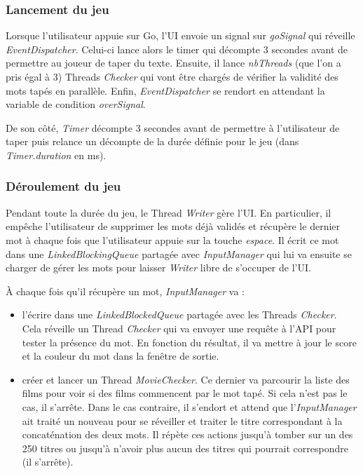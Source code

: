 \documentclass[a4paper,11pt]{article}
\begin{document}
\subsubsection{Lancement du jeu}
Lorsque l'utilisateur appuie sur Go, l'UI envoie un signal sur \textit{goSignal} qui réveille \textit{EventDispatcher}. Celui-ci lance alors le timer qui décompte 3 secondes avant de permettre au joueur de taper du texte. Ensuite, il lance \textit{nbThreads} (que l'on a pris égal à 3) Threads \textit{Checker} qui vont être chargés de vérifier la validité des mots tapés en parallèle. Enfin, \textit{EventDispatcher} se rendort en attendant la variable de condition \textit{overSignal}.\par
De son côté, \textit{Timer} décompte 3 secondes avant de permettre à l'utilisateur de taper puis relance un décompte de la durée définie pour le jeu (dans \textit{Timer.duration} en ms).\par
\subsubsection{Déroulement du jeu} 
Pendant toute la durée du jeu, le Thread \textit{Writer} gère l'UI. En particulier, il empêche l'utilisateur de supprimer les mots déjà validés et récupère le dernier mot à chaque fois que l'utilisateur appuie sur la touche \textit{espace}. Il écrit ce mot dans une \textit{LinkedBlockingQueue} partagée avec \textit{InputManager} qui lui va ensuite se charger de gérer les mots pour laisser \textit{Writer} libre de s'occuper de l'UI.\par
À chaque fois qu'il récupère un mot, \textit{InputManager} va :
\begin{itemize}
\item l'écrire dans une \textit{LinkedBlockedQueue} partagée avec les Threads \textit{Checker}. Cela réveille un Thread \textit{Checker} qui va envoyer une requête à l'API pour tester la présence du mot. En fonction du résultat, il va mettre à jour le score et la couleur du mot dans la fenêtre de sortie.
\item créer et lancer un Thread \textit{MovieChecker}. Ce dernier va parcourir la liste des films pour voir si des films commencent par le mot tapé. Si cela n'est pas le cas, il s'arrête. Dans le cas contraire, il s'endort et attend que l'\textit{InputManager} ait traité un nouveau pour se réveiller et traiter le titre correspondant à la concaténation des deux mots. Il répète ces actions jusqu'à tomber sur un des 250 titres ou jusqu'à n'avoir plus aucun des titres qui pourrait correspondre (il s'arrête).
\end{itemize}
\end{document}
